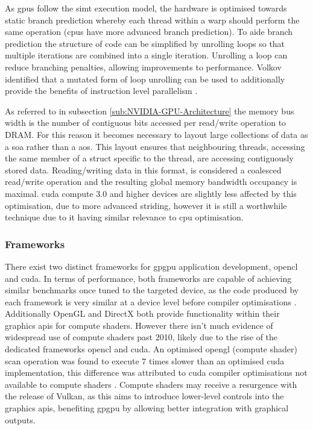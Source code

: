       As \glspl{gpu} follow the \gls{simt} execution model, the hardware is optimised towards static branch prediction whereby each thread within a warp should perform the same operation (\glspl{cpu} have more advanced branch prediction). To aide branch prediction the structure of code can be simplified by unrolling loops so that multiple iterations are combined into a single iteration. Unrolling a loop can reduce branching penalties, allowing improvements to performance. Volkov identified that a mutated form of loop unrolling can be used to additionally provide the benefits of instruction level parallelism \cite{VV11}.
      
      As referred to in subsection \ref{sub:NVIDIA-GPU-Architecture} the memory bus width is the number of contiguous bits accessed per read/write operation to DRAM. For this reason it becomes necessary to layout large collections of data as a \gls{soa} rather than a \gls{aos}. This layout ensures that neighbouring threads, accessing the same member of a struct specific to the thread, are accessing contiguously stored data. Reading/writing data in this format, is considered a coalesced read/write operation and the resulting global memory bandwidth occupancy is maximal. \gls{cuda} compute 3.0 and higher devices are slightly less affected by this optimisation, due to more advanced striding, however it is still a worthwhile technique due to it having similar relevance to \gls{cpu} optimisation.
      
    \subsubsection{Frameworks}
      There exist two distinct frameworks for \gls{gpgpu} application development, \gls{opencl} and \gls{cuda}. In terms of performance, both frameworks are capable of achieving similar benchmarks once tuned to the targeted device, as the code produced by each framework is very similar at a device level before compiler optimisations \cite{KDH11, FVS11}. Additionally OpenGL and DirectX both provide functionality within their graphics \glspl{api} for compute shaders. However there isn't much evidence of widespread use of compute shaders past 2010, likely due to the rise of the dedicated frameworks \gls{opencl} and \gls{cuda}. An optimised \gls{opengl} (compute shader) scan operation was found to execute 7 times slower than an optimised \gls{cuda} implementation, this difference was attributed to \gls{cuda} compiler optimisations not available to compute shaders \cite{HSO07}. Compute shaders may receive a resurgence with the release of Vulkan, as this aims to introduce lower-level controls into the graphics \glspl{api}, benefiting \gls{gpgpu} by allowing better integration with graphical outputs.
      
